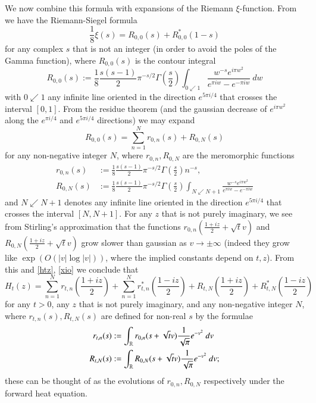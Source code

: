 We now combine this formula with expansions of the Riemann $\xi$-function.  From \cite[(2.10.6)]{titch} we have the Riemann-Siegel formula
\begin{equation}\label{xio}
 \frac{1}{8} \xi(s) = R_{0,0}(s) + R_{0,0}^*(1-s) 
\end{equation}
for any complex $s$ that is not an integer (in order to avoid the poles of the Gamma function), where $R_{0,0}(s)$ is the contour integral
$$ R_{0,0}(s) := \frac{1}{8} \frac{s(s-1)}{2} \pi^{-s/2} \Gamma(\frac{s}{2}) \int_{0 \swarrow 1} \frac{w^{-s} e^{i\pi w^2}}{e^{\pi i w} - e^{-\pi i w}}\ dw$$
with $0 \swarrow 1$ any infinite line oriented in the direction $e^{5\pi i/4}$ that crosses the interval $[0,1]$.  From the residue theorem (and the gaussian decrease of $e^{i\pi w^2}$ along the $e^{\pi i/4}$ and $e^{5\pi i/4}$ directions) we may expand
$$ R_{0,0}(s) = \sum_{n=1}^N r_{0,n}(s)+ R_{0,N}(s)$$
for any non-negative integer $N$, where $r_{0,n}, R_{0,N}$ are the meromorphic functions
\begin{align}
 r_{0,n}(s) &:= \frac{1}{8} \frac{s(s-1)}{2} \pi^{-s/2} \Gamma(\frac{s}{2}) n^{-s},\label{ron-def} \\
R_{0,N}(s) &:= \frac{1}{8} \frac{s(s-1)}{2} \pi^{-s/2} \Gamma(\frac{s}{2}) \int_{N \swarrow N+1} \frac{w^{-s} e^{i\pi w^2}}{e^{\pi i w} - e^{-\pi i w}}\label{RON-def}
\end{align}
and $N \swarrow N+1$ denotes any infinite line oriented in the direction $e^{5\pi i /4}$ that crosses the interval $[N,N+1]$.  For any $z$ that is not purely imaginary, we see from Stirling's approximation that the functions $r_{0,n}(\frac{1+iz}{2} + \sqrt{t} v)$ and $R_{0,N}(\frac{1+iz}{2} + \sqrt{t} v)$ grow slower than gaussian as $v \to \pm \infty$ (indeed they grow like $\exp( O( |v| \log |v| ) )$, where the implied constants depend on $t,z$).  From this and
\eqref{htz}, \eqref{xio} we conclude that
\begin{equation}\label{htz-expand}
 H_t(z) = \sum_{n=1}^N r_{t,n}(\frac{1+iz}{2}) + \sum_{n=1}^N r_{t,n}^*(\frac{1-iz}{2}) + R_{t,N}(\frac{1+iz}{2}) + R_{t,N}^*(\frac{1-iz}{2})
\end{equation}
for any $t>0$, any $z$ that is not purely imaginary, and any non-negative integer $N$, where $r_{t,n}(s), R_{t,N}(s)$ are defined for non-real $s$ by the formulae
\begin{align*}
 r_{t,n}(s) &:= \int_{\mathbb{R}} r_{0,n}( s + \sqrt{t} v ) \frac{1}{\sqrt{\pi}} e^{-v^2}\ dv\\
 R_{t,N}(s) &:= \int_{\mathbb{R}} R_{0,N}( s + \sqrt{t} v ) \frac{1}{\sqrt{\pi}} e^{-v^2}\ dv;
\end{align*}
these can be thought of as the evolutions of $r_{0,n}, R_{0,N}$ respectively under the forward heat equation.


